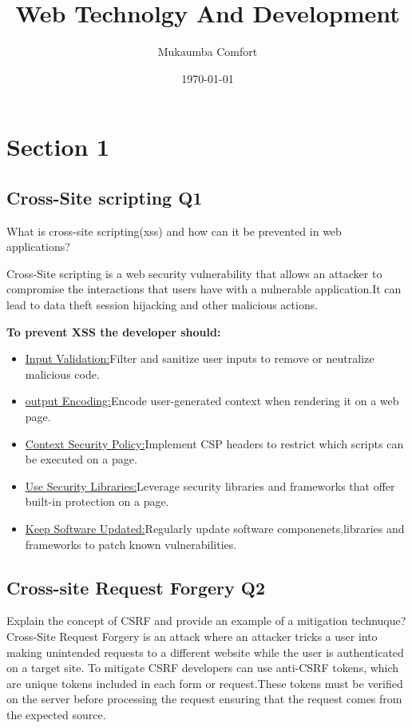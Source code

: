 \documentclass{article}
\author{Mukaumba Comfort}
\title{Web Technolgy And Development}
\date{\today}
\begin{document}
\maketitle

\section{Section 1}
\subsection{Cross-Site scripting Q1}What is cross-site scripting(xss) and how can it be prevented in web applications? \par
Cross-Site scripting is a web security vulnerability that allows an attacker to compromise the interactions that users have with a nulnerable application.It can lead to data theft session hijacking and other malicious actions.\par
\textbf {To prevent XSS  the developer should:}
\begin{itemize}
    \item \underline{Input Validation:}Filter and sanitize user  inputs to remove or neutralize malicious code.
    \item \underline{output Encoding:}Encode user-generated context when rendering it on a web page.
    \item \underline{Context Security Policy:}Implement CSP headers to restrict which scripts can be executed on a page.
    \item \underline{Use Security Libraries:}Leverage security libraries and frameworks that offer built-in protection on a page.
    \item \underline{Keep Software Updated:}Regularly update software componenets,libraries and frameworks to patch known vulnerabilities. 
\end{itemize}
\subsection{Cross-site Request Forgery Q2}Explain the concept of CSRF and provide an example of a mitigation technuque?
Cross-Site Request Forgery is an attack where an attacker tricks a user into making unintended requests to a different website while the user is authenticated on a target site.
To mitigate CSRF developers can use anti-CSRF tokens, which are unique tokens included in each form or request.These tokens must be verified on the server before processing the request ensuring that the request comes from the expected source.
\end{document}
